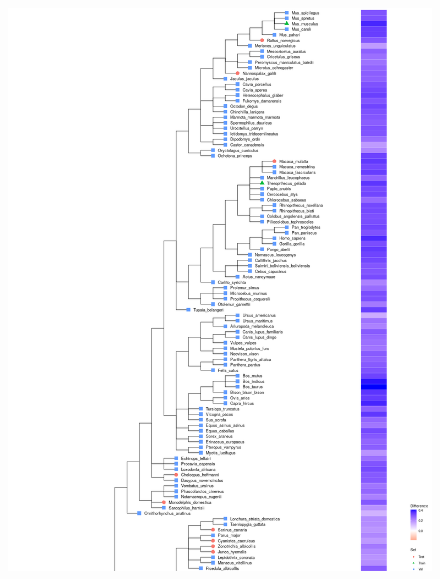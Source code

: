 \documentclass{article}
\begin{document}
\begin{figure}[!h]
\centerline{\includegraphics[width=1.2\textwidth]{images/animals_differences_part1}}
\end{figure}
\end{document}
